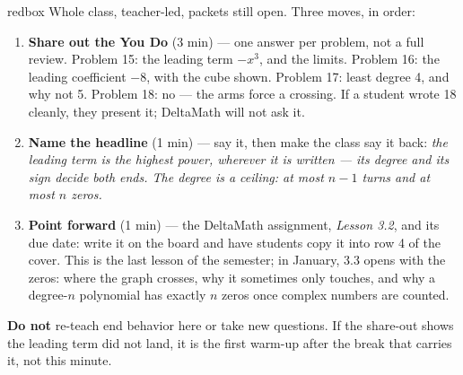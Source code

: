 \documentclass[10pt]{article}
\begin{document}
\boxguard[20]
\begin{skillbox}{redbox}
Whole class, teacher-led, packets still open. Three moves, in order:
\begin{enumerate}[itemsep=3pt]
  \item \textbf{Share out the You Do} (3 min) --- one answer per problem, not a full review.
        Problem 15: the leading term $-x^3$, and the limits. Problem 16: the leading
        coefficient $-8$, with the cube shown. Problem 17: least degree 4, and why not 5.
        Problem 18: no --- the arms force a crossing. If a student wrote 18 cleanly, they
        present it; DeltaMath will not ask it.
  \item \textbf{Name the headline} (1 min) --- say it, then make the class say it back:
        \textit{the leading term is the highest power, wherever it is written --- its degree
        and its sign decide both ends. The degree is a ceiling: at most $n - 1$ turns and at
        most $n$ zeros.}
  \item \textbf{Point forward} (1 min) --- the DeltaMath assignment, \textit{Lesson 3.2}, and
        its due date: write it on the board and have students copy it into row 4 of the
        cover. This is the last lesson of the semester; in January, 3.3 opens with the
        zeros: where the graph crosses, why it sometimes only touches, and why a degree-$n$
        polynomial has exactly $n$ zeros once complex numbers are counted.
\end{enumerate}
\textbf{Do not} re-teach end behavior here or take new questions. If the share-out shows the
leading term did not land, it is the first warm-up after the break that carries it, not this
minute.
\end{skillbox}
\end{document}
